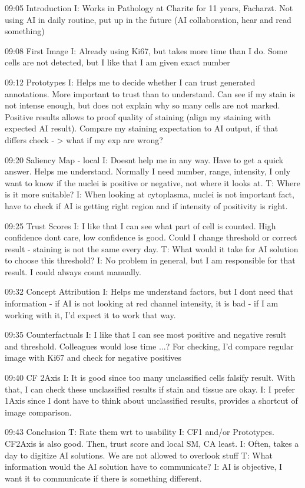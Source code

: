 09:05 Introduction
I: Works in Pathology at Charite for 11 years, Facharzt. Not using AI in daily routine, put up in the future (AI collaboration, hear and read something)
 
09:08 First Image
I: Already using Ki67, but takes more time than I do. Some cells are not detected, but I like that I am given exact number

09:12 Prototypes
I: Helps me to decide whether I can trust generated annotations. More important to trust than to understand. Can see if my stain is not intense enough, but does not explain why so
many cells are not marked. Positive results allows to proof quality of staining (align my staining with expected AI result). Compare my staining expectation to AI output, if that differs check - > what if my exp are wrong?

09:20 Saliency Map - local
I: Doesnt help me in any way. Have to get a quick answer. Helps me understand. Normally I need number, range, intensity, I only want to know if the nuclei is positive or negative, 
not where it looks at. T: Where is it more suitable? I: When looking at cytoplasma, nuclei is not important fact, have to check if AI is getting right region and if intensity of positivity is right.

09:25 Trust Scores
I: I like that I can see what part of cell is counted. High confidence dont care, low confidence is good. Could I change threshold or correct result - staining is not the same every day.
T: What would it take for AI solution to choose this threshold? I: No problem in general, but I am responsible for that result. I could always count manually.

09:32 Concept Attribution
I: Helps me understand factors, but I dont need that information - if AI is not looking at red channel intensity, it is bad - if I am working with it, I'd expect it to work that way.

09:35 Counterfactuals
I: I like that I can see most positive and negative result and threshold. Colleagues would lose time ...? For checking, I'd compare regular image with Ki67 and check for negative positives

09:40 CF 2Axis
I: It is good since too many unclassified cells falsify result. With that, I can check these unclassified results if stain and tissue are okay. 
I: I prefer 1Axis since I dont have to think about unclassified results, provides a shortcut of image comparison.

09:43 Conclusion
T: Rate them wrt to usability I: CF1 and/or Prototypes. CF2Axis is also good. Then, trust score and local SM, CA least.
I: Often, takes a day to digitize AI solutions. We are not allowed to overlook stuff
T: What information would the AI solution have to communicate? I: AI is objective, I want it to communicate if there is something different.

